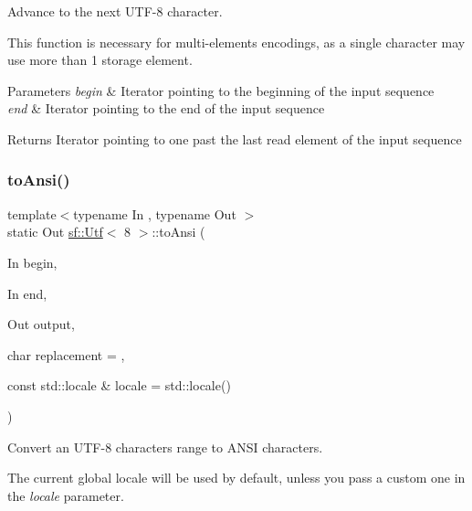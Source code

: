 Advance to the next U\+T\+F-\/8 character. 

This function is necessary for multi-\/elements encodings, as a single character may use more than 1 storage element.


\begin{DoxyParams}{Parameters}
{\em begin} & Iterator pointing to the beginning of the input sequence \\
\hline
{\em end} & Iterator pointing to the end of the input sequence\\
\hline
\end{DoxyParams}
\begin{DoxyReturn}{Returns}
Iterator pointing to one past the last read element of the input sequence 
\end{DoxyReturn}
\mbox{\label{classsf_1_1_utf_3_018_01_4_a3d8b02f29021bd48831e7706d826f0c5}} 
\subsubsection{\texorpdfstring{to\+Ansi()}{toAnsi()}}
{\footnotesize\ttfamily template$<$typename In , typename Out $>$ \\
static Out \hyperlink{classsf_1_1_utf}{sf\+::\+Utf}$<$ 8 $>$\+::to\+Ansi (\begin{DoxyParamCaption}\item[{In}]{begin,  }\item[{In}]{end,  }\item[{Out}]{output,  }\item[{char}]{replacement = {},  }\item[{const std\+::locale \&}]{locale = {\ttfamily std\+:\+:locale()} }\end{DoxyParamCaption})\hspace{0.3cm}{\ttfamily [static]}}



Convert an U\+T\+F-\/8 characters range to A\+N\+SI characters. 

The current global locale will be used by default, unless you pass a custom one in the {\itshape locale} parameter.


